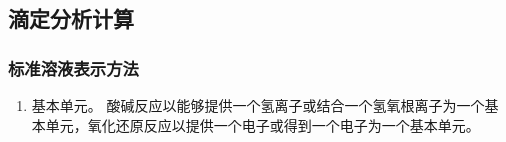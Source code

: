 \subsection{滴定分析计算}

\subsubsection{标准溶液表示方法}


\begin{enumerate}
	\item 基本单元。 酸碱反应以能够提供一个氢离子或结合一个氢氧根离子为一个基本单元，氧化还原反应以提供一个电子或得到一个电子为一个基本单元。 
	
\end{enumerate}


